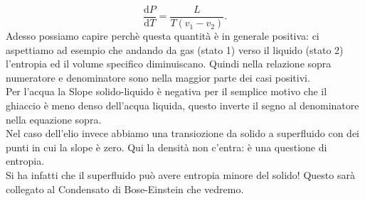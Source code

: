 \[
	\frac{\mbox{d} P}{\mbox{d} T} = \frac{L}{T\left( v_1-v_2 \right) }
.\] 
Adesso possiamo capire perchè questa quantità è in generale positiva: ci aspettiamo ad esempio che andando da gas (stato 1) verso il liquido (stato 2) l'entropia ed il volume specifico diminuiscano. Quindi nella relazione sopra numeratore e denominatore sono nella maggior parte dei casi positivi.\\
Per l'acqua la Slope solido-liquido è negativa per il semplice motivo che il ghiaccio è meno denso dell'acqua liquida, questo inverte il segno al denominatore nella equazione sopra.\\
Nel caso dell'elio invece abbiamo una transiozione da solido a superfluido con dei punti in cui la slope è zero. Qui la densità non c'entra: è una questione di entropia. \\
Si ha infatti che il superfluido può avere entropia minore del solido! Questo sarà collegato al Condensato di Bose-Einstein che vedremo.


